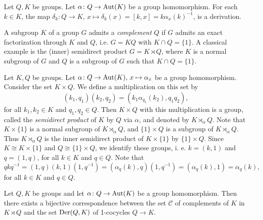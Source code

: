 \begin{example}
	Let $Q,K$ be groups. Let $\alpha\colon Q\rightarrow \operatorname{Aut}(K)$ be a group homomorphism.  For each $k\in K$, the map 
	$\delta_k\colon Q\to K$, $x\mapsto \delta_k(x)=[k,x]=k\alpha_x(k)^{-1}$, is a derivation. 
\end{example}


A subgroup $K$ of a group $G$ admits a {\em complement} $Q$ if $G$ admits an exact factorization 
through $K$ and $Q$, i.e. $G=KQ$ with $K\cap Q=\{1\}$. 
A classical example is the (inner) semidirect product $G=K\rtimes Q$, where $K$ is a normal subgroup of $G$ 
and $Q$ is a subgroup of $G$ such that $K\cap Q=\{1\}$. 

Let $K,Q$ be groups. Let $\alpha\colon Q\rightarrow \operatorname{Aut}(K),\,x\mapsto \alpha_x$ be a group homomorphism. Consider the set $K\times Q$. We define a multiplication on this set by
\[(k_1,q_1)(k_2,q_2)=(k_1\alpha_{q_1}(k_2),q_1q_2),\]
for all $k_1,k_2\in K$ and $q_1,q_2\in Q$. Then $K\times Q$ with this multiplication is a group, called the {\em semidirect product} of $K$ by $Q$ via $\alpha$, and denoted by $K\rtimes_{\alpha}Q$. Note that $K\times\{ 1\}$ is a normal subgroup of $K\rtimes_{\alpha}Q$, and $\{1\}\times Q$ is a subgroup of $K\rtimes_{\alpha}Q$. Thus $K\rtimes_{\alpha}Q$ is the inner semidirect product of $K\times\{ 1\}$ by $\{1\}\times Q$. Since $K\cong K\times\{ 1\}$ and $Q\cong \{1\}\times Q$, we identify these groups, i. e. $k=(k,1)$ and $q=(1,q)$, for all $k\in K$ and $q\in Q$. Note that
\[ qkq^{-1}=(1,q)(k,1)(1,q^{-1})=(\alpha_q(k),q)(1,q^{-1})=(\alpha_q(k),1)=\alpha_q(k),\]
for all $k\in K$ and $q\in Q$.

\begin{theorem}
	\label{thm:complements}
	Let $Q,K$ be groups and let $\alpha\colon Q\rightarrow \operatorname{Aut} (K)$ be a group homomorphism. Then there exists a bijective correspondence between
	the set $\mathcal{C}$ of complements of $K$ in $K\rtimes Q$ and the set 
    $\operatorname{Der}(Q,K)$ of 1-cocycles $Q\to K$.
\end{theorem}

